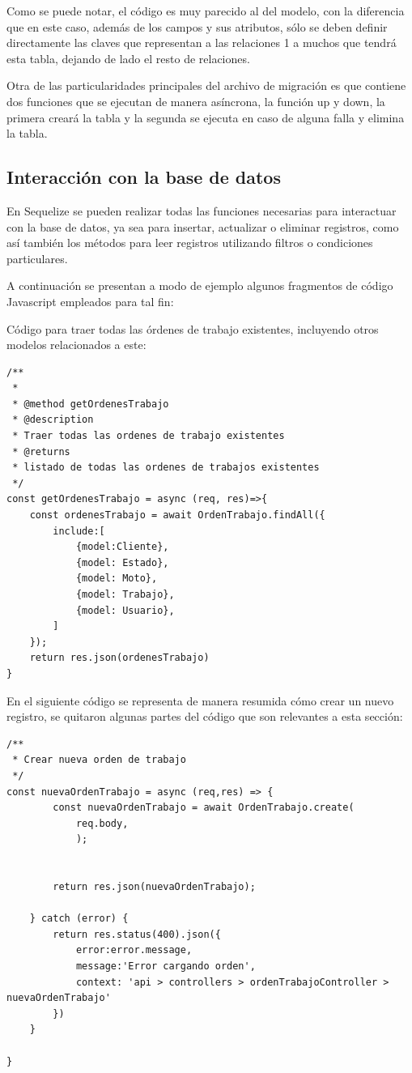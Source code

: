 Como se puede notar, el código es muy parecido al del modelo, con la diferencia que en este caso, además de los campos y sus atributos, sólo se deben definir directamente las claves que representan a las relaciones 1 a muchos que tendrá esta tabla, dejando de lado el resto de relaciones. 

Otra de las particularidades principales del archivo de migración es que contiene dos funciones que se ejecutan de manera asíncrona, la función up y down, la primera creará la tabla y la segunda se ejecuta en caso de alguna falla y elimina la tabla. 
  

\subsection{Interacción con la base de datos}
\label{subsec:interaccionbasededatos}

En Sequelize se pueden realizar todas las funciones necesarias para interactuar con la base de datos, ya sea para insertar, actualizar o eliminar registros, como así también los métodos para leer registros utilizando filtros o condiciones particulares.

A continuación se presentan a modo de ejemplo algunos fragmentos de código Javascript empleados para tal fin:

Código para traer todas las órdenes de trabajo existentes, incluyendo otros modelos relacionados a este:

\begin{lstlisting}[caption= Código para traer datos en Sequelize.]
/**
 * 
 * @method getOrdenesTrabajo 
 * @description
 * Traer todas las ordenes de trabajo existentes
 * @returns
 * listado de todas las ordenes de trabajos existentes
 */
const getOrdenesTrabajo = async (req, res)=>{
    const ordenesTrabajo = await OrdenTrabajo.findAll({
        include:[
            {model:Cliente},
            {model: Estado},
            {model: Moto},
            {model: Trabajo},
            {model: Usuario},
        ]
    });
    return res.json(ordenesTrabajo)
}
\end{lstlisting}

En el siguiente código se representa de manera resumida cómo crear un nuevo registro, se quitaron algunas partes del código que son relevantes a esta sección:

\begin{lstlisting}[label=cod:nuevoregistro,caption=Código resumido para crear nuevo registro en la base de datos.]
/**
 * Crear nueva orden de trabajo
 */
const nuevaOrdenTrabajo = async (req,res) => {
        const nuevaOrdenTrabajo = await OrdenTrabajo.create(
            req.body, 
            );
  

        return res.json(nuevaOrdenTrabajo);
        
    } catch (error) {
        return res.status(400).json({
            error:error.message, 
            message:'Error cargando orden',
            context: 'api > controllers > ordenTrabajoController > nuevaOrdenTrabajo'
        })  
    }
    
}
\end{lstlisting}

